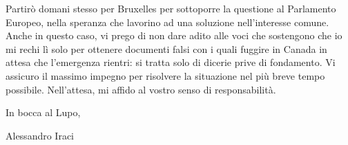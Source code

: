 \documentclass{letter}
\begin{document}
\begin{letter}{}
Partirò domani stesso per Bruxelles per sottoporre la questione al Parlamento Europeo, nella speranza che lavorino ad una soluzione nell'interesse comune. Anche in questo caso, vi prego di non dare adito alle voci che sostengono che io mi rechi lì solo per ottenere documenti falsi con i quali fuggire in Canada in attesa che l'emergenza rientri: si tratta solo di dicerie prive di fondamento. Vi assicuro il massimo impegno per risolvere la situazione nel più breve tempo possibile. Nell'attesa, mi affido al vostro senso di responsabilità.

In bocca al Lupo,

\bigskip

\noindent Alessandro Iraci

\end{letter}
\end{document}

